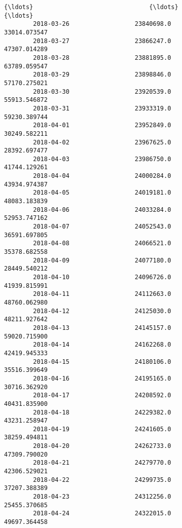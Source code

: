 \documentclass[11pt]{article}
\begin{document}
\begin{Verbatim}[commandchars=\\\{\}]
        {\ldots}                                {\ldots}                            {\ldots}   
        2018-03-26                  23840698.0                   33014.073547   
        2018-03-27                  23866247.0                   47307.014289   
        2018-03-28                  23881895.0                   63789.059547   
        2018-03-29                  23898846.0                   57170.275021   
        2018-03-30                  23920539.0                   55913.546872   
        2018-03-31                  23933319.0                   59230.389744   
        2018-04-01                  23952849.0                   30249.582211   
        2018-04-02                  23967625.0                   28392.697477   
        2018-04-03                  23986750.0                   41744.129261   
        2018-04-04                  24000284.0                   43934.974387   
        2018-04-05                  24019181.0                   48083.183839   
        2018-04-06                  24033284.0                   52953.747162   
        2018-04-07                  24052543.0                   36591.697805   
        2018-04-08                  24066521.0                   35378.682558   
        2018-04-09                  24077180.0                   28449.540212   
        2018-04-10                  24096726.0                   41939.815991   
        2018-04-11                  24112663.0                   48760.062980   
        2018-04-12                  24125030.0                   48211.927642   
        2018-04-13                  24145157.0                   59020.715900   
        2018-04-14                  24162268.0                   42419.945333   
        2018-04-15                  24180106.0                   35516.399649   
        2018-04-16                  24195165.0                   30716.362920   
        2018-04-17                  24208592.0                   40431.835900   
        2018-04-18                  24229382.0                   43231.258947   
        2018-04-19                  24241605.0                   38259.494811   
        2018-04-20                  24262733.0                   47309.790020   
        2018-04-21                  24279770.0                   42306.529021   
        2018-04-22                  24299735.0                   37207.388389   
        2018-04-23                  24312256.0                   25455.370685   
        2018-04-24                  24322015.0                   49697.364458   
        

\end{Verbatim}
\end{document}
